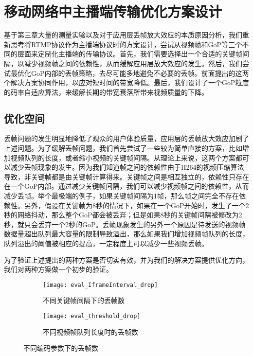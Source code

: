 \chapter{移动网络中主播端传输优化方案设计}

基于第三章大量的测量实验以及对于应用层丢帧放大效应的本质原因分析，我们重新思考将RTMP协议作为主播端协议时的方案设计，尝试从视频帧和GoP等三个不同的层面来定制化主播端的传输协议。首先，我们需要选择出一个合适的关键帧间隔，以减少视频帧之间的依赖性，从而缓解应用层放大效应的发生。然后，我们尝试最优化GoP内部的丢帧策略，去尽可能多地避免不必要的丢帧。前面提出的这两个解决方案协同作用，以应对短时间的带宽降低。最后，我们设计了一个GoP粒度的码率自适应算法，来缓解长期的带宽衰落所带来视频质量的下降。

\section{优化空间}
\label{sec:design_space}

丢帧问题的发生明显地降低了观众的用户体验质量，应用层的丢帧放大效应加剧了上述问题。为了缓解丢帧问题，我们首先尝试了一些较为简单直接的方案，比如增加视频队列的长度，或者缩小视频的关键帧间隔。从理论上来说，这两个方案都可以减少丢帧现象的发生。因为我们知道帧之间的依赖性由于H264的视频压缩算法导致，非关键帧都是由关键帧计算得来。关键帧之间是相互独立的，依赖性只存在在一个GoP内部。通过减少关键帧间隔，我们可以减少视频帧之间的依赖性，从而减少丢帧。举个最极端的例子，如果关键帧间隔为1帧，那么帧之间完全不存在依赖性。另外，假设在关键帧为8秒的情况下，如果在一个GoP开始时，发生了一个2秒的网络抖动，那么整个GoP都会被丢弃；但是如果8秒的关键帧间隔被修改为2秒，就只会丢弃一个2秒的GoP。丢帧现象发生的另外一个原因是待发送的视频帧数据量超出队列最大容量的限制导致溢出，那么如果我们增加视频帧队列的长度，队列溢出的阈值被相应的提高，一定程度上可以减少一些视频丢帧。

为了验证上述提出的两种方案是否切实有效，并为我们的解决方案提供优化方向，我们对两种方案做一个初步的验证。

\begin{figure}[h]%
  \centering
  \begin{subfigure}{0.49\textwidth}
      \texttt{[image: eval\_IframeInterval\_drop]}
      \caption{不同关键帧间隔下的丢帧数}
      \label{fig:keyframe_drop}
  \end{subfigure}
  \hfill
  \begin{subfigure}{0.49\textwidth}
      \texttt{[image: eval\_threshold\_drop]}
      \caption{不同视频帧队列长度时的丢帧数}
      \label{fig:threshold_drop}
  \end{subfigure}
  \vspace{0.1in}
  \caption{不同编码参数下的丢帧数}
  \label{fig:prelimary_drop}
\end{figure}

